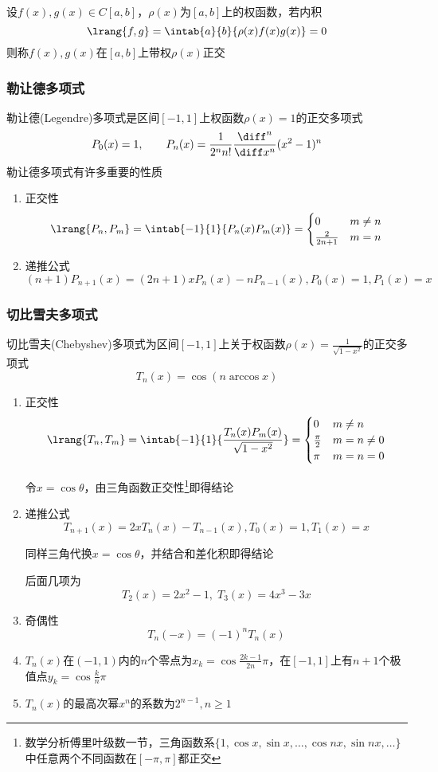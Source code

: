 \begin{definition}[正交]
    设$f(x),g(x)\in C[a,b]$，$\rho(x)$为$[a,b]$上的权函数，若内积
    \[\lrang{f,g}=\intab{a}{b}{\rho(x)f(x)g(x)}=0\]
    则称$f(x),g(x)$在$[a,b]$上带权$\rho(x)$正交
\end{definition}

\subsubsection{勒让德多项式}
勒让德(Legendre)多项式是区间$[-1,1]$上权函数$\rho(x)=1$的正交多项式
\[P_0(x)=1,\qquad P_n(x)=\frac{1}{2^nn!}\frac{\diff^n}{\diff x^n}(x^2-1)^n\]
勒让德多项式有许多重要的性质
\begin{enumerate}
    \item 正交性
\[\lrang{P_n,P_m}=\intab{-1}{1}{P_n(x)P_m(x)}=\begin{cases}0&m\ne n\\\frac{2}{2n+1}&m=n\end{cases}\]
    \item 递推公式
    \[(n+1)P_{n+1}(x)=(2n+1)xP_n(x)-nP_{n-1}(x),P_0(x)=1,P_1(x)=x\]
\end{enumerate}

\subsubsection{切比雪夫多项式}
切比雪夫(Chebyshev)多项式为区间$[-1,1]$上关于权函数$\rho(x)=\frac{1}{\sqrt{1-x^2}}$的正交多项式
\[T_n(x)=\cos(n\arccos x)\]
\begin{enumerate}
    \item 正交性
\[\lrang{T_n,T_m}=\intab{-1}{1}{\frac{T_n(x)P_m(x)}{\sqrt{1-x^2}}}=\begin{cases}0&m\ne n\\\frac{\pi}{2}&m=n\ne 0\\\pi&m=n=0\end{cases}\]
    \begin{analysis}
        令$x=\cos\theta$，由三角函数正交性\footnote{数学分析傅里叶级数一节，三角函数系$\{1,\cos x,\sin x,\ldots,\cos nx,\sin nx,\ldots\}$中任意两个不同函数在$[-\pi,\pi]$都正交}即得结论
    \end{analysis}
    \item 递推公式
\[T_{n+1}(x)=2xT_n(x)-T_{n-1}(x),T_0(x)=1,T_1(x)=x\]
\begin{analysis}
    同样三角代换$x=\cos\theta$，并结合和差化积即得结论
\end{analysis}
后面几项为
\[T_2(x)=2x^2-1,\;T_3(x)=4x^3-3x\]
    \item 奇偶性
\[T_n(-x)=(-1)^nT_n(x)\]
    \item $T_n(x)$在$(-1,1)$内的$n$个零点为$x_k=\cos\frac{2k-1}{2n}\pi$，在$[-1,1]$上有$n+1$个极值点$y_k=\cos\frac{k}{n}\pi$
    \item $T_n(x)$的最高次幂$x^n$的系数为$2^{n-1},n\geq 1$
\end{enumerate}


